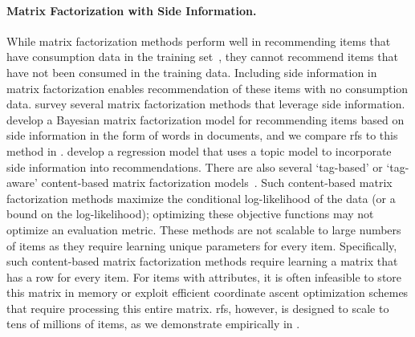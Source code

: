 \paragraph{Matrix Factorization with Side Information.} While matrix factorization methods perform well in recommending items that have consumption data in the training set~\citep{hu2008collaborative,liang2016factorization}, they cannot recommend items that have not been consumed in the training data. Including side information in matrix factorization enables recommendation of these items with no consumption data. \citet{shi2014collaborative} survey several matrix factorization methods that leverage  side information. \citet{gopalan2014content-based} develop a Bayesian matrix factorization model for recommending items based on side information in the form of words in documents, and we compare \gls{rfs} to this method in . \citet{wang2011collaborative} develop a regression model that uses a topic model to incorporate side information into recommendations. There are also several `tag-based' or `tag-aware' content-based matrix factorization models~\citep{zhen2009tagicofi:,loepp2019interactive,bogers2018tag-based}. Such content-based matrix factorization methods maximize the conditional log-likelihood of the data (or a bound on the log-likelihood); optimizing these objective functions may not optimize an evaluation metric. These methods are not scalable to large numbers of items as they require learning unique parameters for every item. Specifically, such content-based matrix factorization methods require learning a matrix that has a row for every item. For items with attributes, it is often infeasible to store this matrix in memory or exploit efficient coordinate ascent optimization schemes that require processing this entire matrix. \gls{rfs}, however, is designed to scale to tens of millions of items, as we demonstrate empirically in .

